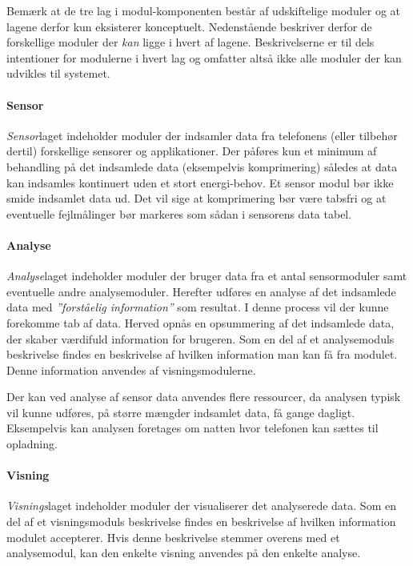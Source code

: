 Bemærk at de tre lag i modul-komponenten består af udskiftelige moduler og at lagene derfor kun eksisterer konceptuelt.
Nedenstående beskriver derfor de forskellige moduler der \textit{kan} ligge i hvert af lagene.
Beskrivelserne er til dels intentioner for modulerne i hvert lag og omfatter altså ikke alle moduler der kan udvikles til systemet.

\paragraph{Sensor}
\textit{Sensor}laget indeholder moduler der indsamler data fra telefonens (eller tilbehør dertil) forskellige sensorer og applikationer.
Der påføres kun et minimum af behandling på det indsamlede data (eksempelvis komprimering) således at data kan indsamles kontinuert uden et stort energi-behov.
Et sensor modul bør ikke smide indsamlet data ud.
Det vil sige at komprimering bør være tabsfri og at eventuelle fejlmålinger bør markeres som sådan i sensorens data tabel.

\paragraph{Analyse}
\textit{Analyse}laget indeholder moduler der bruger data fra et antal sensormoduler samt eventuelle andre analysemoduler.
Herefter udføres en analyse af det indsamlede data med \textit{''forståelig information''} som resultat.
I denne process vil der kunne forekomme tab af data.
Herved opnås en opsummering af det indsamlede data, der skaber værdifuld information for brugeren.
Som en del af et analysemoduls beskrivelse findes en beskrivelse af hvilken information man kan få fra modulet.
Denne information anvendes af visningsmodulerne.

Der kan ved analyse af sensor data anvendes flere ressourcer, da analysen typisk vil kunne udføres, på større mængder indsamlet data, få gange dagligt.
Eksempelvis kan analysen foretages om natten hvor telefonen kan sættes til opladning.

\paragraph{Visning}
\textit{Visnings}laget indeholder moduler der visualiserer det analyserede data.
Som en del af et visningsmoduls beskrivelse findes en beskrivelse af hvilken information modulet accepterer.
Hvis denne beskrivelse stemmer overens med et analysemodul, kan den enkelte visning anvendes på den enkelte analyse.

